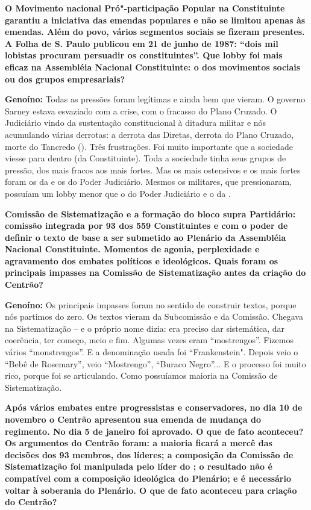 \textbf{O Movimento nacional Pró"-participação Popular na Constituinte
garantiu a iniciativa das emendas populares e não se limitou apenas às
emendas. Além do povo, vários segmentos sociais se fizeram presentes. A
Folha de S. Paulo publicou em 21 de junho de 1987: ``dois mil lobistas
procuram persuadir os constituintes''. Que lobby foi mais eficaz na
Assembléia Nacional Constituinte: o dos movimentos sociais ou dos grupos
empresariais?}

\textbf{Genoíno:} Todas as pressões foram legítimas e ainda bem que
vieram. O governo Sarney estava esvaziado com a crise, com o fracasso do
Plano Cruzado. O Judiciário vindo da sustentação constitucional à
ditadura militar e nós acumulando várias derrotas: a derrota das
Diretas, derrota do Plano Cruzado, morte do Tancredo (). Três
frustrações. Foi muito importante que a sociedade viesse para dentro (da
Constituinte). Toda a sociedade tinha seus grupos de pressão, dos mais
fracos aos mais fortes. Mas os mais ostensivos e os mais fortes foram os
da  e os do Poder Judiciário. Mesmos os militares, que pressionaram,
possuíam um lobby menor que o do Poder Judiciário e o da .

\textbf{Comissão de Sistematização e a formação do bloco supra
Partidário: comissão integrada por 93 dos 559 Constituintes e com o
poder de definir o texto de base a ser submetido ao Plenário da
Assembléia Nacional Constituinte. Momentos de agonia, perplexidade e
agravamento dos embates políticos e ideológicos. Quais foram os
principais impasses na Comissão de Sistematização antes da criação do
Centrão?}

\textbf{Genoíno:} Os principais impasses foram no sentido de construir
textos, porque nós partimos do zero. Os textos vieram da Subcomissão e
da Comissão. Chegava na Sistematização -- e o próprio nome dizia: era
preciso dar sistemática, dar coerência, ter começo, meio e fim. Algumas
vezes eram ``mostrengos''. Fizemos vários ``monstrengos''. E a
denominação usada foi ``Frankenstein". Depois veio o ``Bebê de
Rosemary'', veio ``Mostrengo'', ``Buraco Negro''... E o processo foi
muito rico, porque foi se articulando. Como possuíamos maioria na
Comissão de Sistematização.

\textbf{Após vários embates entre progressistas e conservadores, no dia
10 de novembro o Centrão apresentou sua emenda de mudança do regimento.
No dia 5 de janeiro foi aprovado. O que de fato aconteceu? Os argumentos
do Centrão foram: a maioria ficará a mercê das decisões dos 93 membros,
dos líderes; a composição da Comissão de Sistematização foi manipulada
pelo líder do ; o resultado não é compatível com a composição
ideológica do Plenário; e é necessário voltar à soberania do Plenário. O
que de fato aconteceu para criação do Centrão?}

